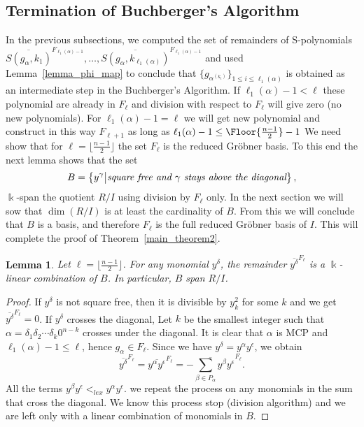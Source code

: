 \documentclass[12pt,reqno]{amsart}
\theoremstyle{plain}
\newtheorem{lemma}[theorem]{Lemma}
\theoremstyle{definition}
\DeclarePairedDelimiter\Floor\lfloor\rfloor
\def\field{\Bbbk}
\begin{document}
\subsection{\label{property_c}Termination of Buchberger's Algorithm}
In the previous subsections, we computed the set of remainders  of S-polynomials $\overline{S(g_\alpha, k_1)}^{F_{\ell_1(\alpha)-1}}, \dots, \overline{S(g_\alpha, k_{\ell_1(\alpha)})}^{F_{\ell_1(\alpha)-1}}$ and used Lemma~\ref{lemma_phi_map} to conclude that $\{g_{\alpha^{(k_i)}}\}_{1\le i\le \ell_1(\alpha)}$ is obtained as an intermediate step in the Buchberger's Algorithm. If $\ell_1(\alpha)-1<\ell$ these polynomial are already in $F_\ell$ and division with respect to $F_\ell$ will give zero (no new polynomials). For $\ell_1(\alpha)-1=\ell$ we will get new polynomial and construct in this way $F_{\ell+1}$ as long as $\ell_1(\alpha)-1 \le \Floor{\frac{n-1}{2}}-1$
We need show that for $\ell = \lfloor \frac{n-1}{2} \rfloor$ the set $F_\ell$ is the reduced Gr\"obner basis.
To this end the next lemma shows that the set
\begin{equation} \label{Eq:basis1}
	B=\big\{ y^\gamma\big| \text{\it square free and $\gamma$ stays above the diagonal}\big\}\,,
\end{equation}
$\field$-span the quotient $R/I$ using division by $F_\ell$ only. In the next section we will sow that $\dim(R/I)$ is at least the cardinality of $B$.
From this we will conclude that $B$ is a basis, and therefore $F_\ell$ is the full reduced Gr\"obner basis of $I$. This will complete the proof of Theorem~\ref{main_theorem2}.

\begin{lemma}
	    \label{lem:Bspan}
	    Let $\ell= \lfloor \frac{n-1}{2} \rfloor$. For any monomial $y^\delta$, the remainder $\overline{y^\delta}^{F_\ell}$ is a $\field$-linear combination of $B$. In particular, $B$ span $R/I$.
    \end{lemma} 

\begin{proof}
If $y^\delta$ is not square free, then it is divisible by $y_k^2$ for some $k$ and we get $\overline{y^\delta}^{F_\ell}=0$. 
If $y^\delta$ crosses the diagonal, 
Let $k$ be the smallest integer such that $\alpha=\delta_1\delta_2\cdots\delta_k 0^{n-k}$ 
crosses under the diagonal. It is clear that $\alpha$ is MCP and $\ell_1(\alpha)-1\le \ell$, hence $g_\alpha\in F_\ell$. Since we have $y^\delta=y^\alpha y^\epsilon$, we obtain
\begin{equation}\label{eq:contra}
	\overline{y^\delta}^{F_\ell}=\overline{y^\alpha y^\epsilon}^{F_\ell}=\overline{-\sum_{\beta\in P_\alpha}y^\beta y^\epsilon}^{F_\ell}.
\end{equation}
All the terms $y^\beta y^\epsilon<_{lex} y^\alpha y^\epsilon$. we repeat the process on any monomials in the sum that cross the diagonal. 
We know this process stop (division algorithm) and we are left only with a linear combination of monomials in $B$.
\end{proof}
\end{document}
